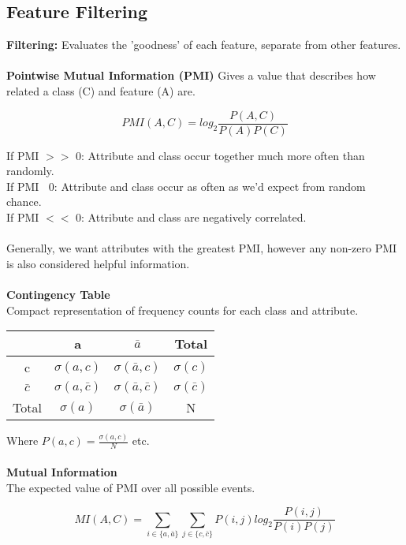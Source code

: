 \documentclass[a4paper,10pt]{article}
\begin{document}
\subsection*{Feature Filtering}
\textcolor{Periwinkle}{\textbf{Filtering:}} Evaluates the 'goodness' of each feature, separate from other features. \\\\
\noindent \textcolor{Periwinkle}{\textbf{Pointwise Mutual Information (PMI)}}
Gives a value that describes how related a class (C) and feature (A) are.  
\begin{shaded}
	\begin{equation*}
		PMI(A,C) = log_{2}\frac{P(A,C)}{P(A)P(C)}
	\end{equation*}
\end{shaded}
\noindent If PMI $>>$ 0: Attribute and class occur together much more often than randomly. \\
\noindent If PMI $~$ 0: Attribute and class occur as often as we'd expect from random chance. \\
\noindent If PMI $<<$ 0: Attribute and class are negatively correlated. \\\\
Generally, we want attributes with the greatest PMI, however any non-zero PMI is also considered helpful information. \\\\
\textcolor{Periwinkle}{\textbf{Contingency Table}}\\
Compact representation of frequency counts for each class and attribute. 
\begin{center}
	\begin{tabular}{|c|c|c|c|}
		\hline
		&a &$\bar{a}$ &Total \\
		\hline 
		c &$\sigma(a,c)$ &$\sigma(\bar{a},c)$ &$\sigma(c)$ \\
		$\bar{c}$ &$\sigma(a,\bar{c})$ &$\sigma(\bar{a},\bar{c})$ &$\sigma(\bar{c})$ \\
		\hline 
		Total &$\sigma(a)$ &$\sigma(\bar{a})$ &N \\
		\hline
	\end{tabular}
\end{center}
\noindent Where $P(a,c) = \frac{\sigma(a,c)}{N}$ etc. \\\\
\textcolor{Periwinkle}{\textbf{Mutual Information}}\\
The expected value of PMI over all possible events. 
\begin{shaded}
	\begin{equation*}
		MI(A,C) = \sum_{i \in \{a, \bar{a}\}} \sum_{j \in \{c, \bar{c}\}} P(i,j) log_{2} \frac{P(i,j)}{P(i)P(j)}
	\end{equation*}
\end{shaded}
\end{document}

